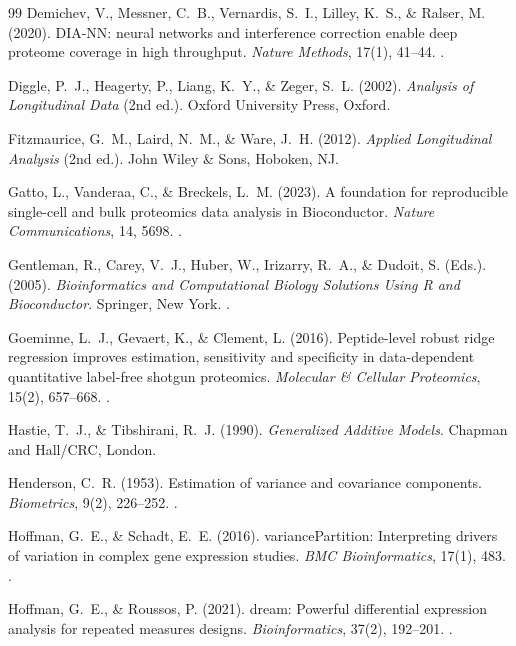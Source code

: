 \documentclass[11pt,twoside,openright]{book}
\begin{document}
\begin{thebibliography}{99}
Demichev, V., Messner, C.~B., Vernardis, S.~I., Lilley, K.~S., \& Ralser, M. (2020). DIA-NN: neural networks and interference correction enable deep proteome coverage in high throughput. \textit{Nature Methods}, 17(1), 41--44. .

Diggle, P.~J., Heagerty, P., Liang, K.~Y., \& Zeger, S.~L. (2002). \textit{Analysis of Longitudinal Data} (2nd ed.). Oxford University Press, Oxford.

Fitzmaurice, G.~M., Laird, N.~M., \& Ware, J.~H. (2012). \textit{Applied Longitudinal Analysis} (2nd ed.). John Wiley \& Sons, Hoboken, NJ.

Gatto, L., Vanderaa, C., \& Breckels, L.~M. (2023). A foundation for reproducible single-cell and bulk proteomics data analysis in Bioconductor. \textit{Nature Communications}, 14, 5698. .

Gentleman, R., Carey, V.~J., Huber, W., Irizarry, R.~A., \& Dudoit, S. (Eds.). (2005). \textit{Bioinformatics and Computational Biology Solutions Using R and Bioconductor}. Springer, New York. .

Goeminne, L.~J., Gevaert, K., \& Clement, L. (2016). Peptide-level robust ridge regression improves estimation, sensitivity and specificity in data-dependent quantitative label-free shotgun proteomics. \textit{Molecular \& Cellular Proteomics}, 15(2), 657--668. .

Hastie, T.~J., \& Tibshirani, R.~J. (1990). \textit{Generalized Additive Models}. Chapman and Hall/CRC, London.

Henderson, C.~R. (1953). Estimation of variance and covariance components. \textit{Biometrics}, 9(2), 226--252. .

Hoffman, G.~E., \& Schadt, E.~E. (2016). variancePartition: Interpreting drivers of variation in complex gene expression studies. \textit{BMC Bioinformatics}, 17(1), 483. .

Hoffman, G.~E., \& Roussos, P. (2021). dream: Powerful differential expression analysis for repeated measures designs. \textit{Bioinformatics}, 37(2), 192--201. .


\end{thebibliography}
\end{document}
